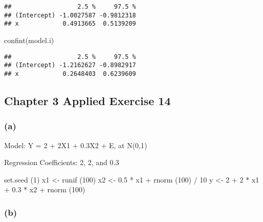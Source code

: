 \documentclass[
]{article}
\newenvironment{Shaded}{\begin{snugshade}}{\end{snugshade}}
\newcommand{\DecValTok}[1]{\textcolor[rgb]{0.00,0.00,0.81}{#1}}
\newcommand{\FloatTok}[1]{\textcolor[rgb]{0.00,0.00,0.81}{#1}}
\newcommand{\FunctionTok}[1]{\textcolor[rgb]{0.00,0.00,0.00}{#1}}
\newcommand{\NormalTok}[1]{#1}
\newcommand{\OtherTok}[1]{\textcolor[rgb]{0.56,0.35,0.01}{#1}}
\newcommand{\SpecialCharTok}[1]{\textcolor[rgb]{0.00,0.00,0.00}{#1}}
\begin{document}
\begin{verbatim}
##                  2.5 %     97.5 %
## (Intercept) -1.0027587 -0.9812318
## x            0.4913665  0.5139209
\end{verbatim}

\begin{Shaded}
\begin{Highlighting}[]
\FunctionTok{confint}\NormalTok{(model.i)}
\end{Highlighting}
\end{Shaded}

\begin{verbatim}
##                  2.5 %     97.5 %
## (Intercept) -1.2162627 -0.8982917
## x            0.2648403  0.6239609
\end{verbatim}

\hypertarget{chapter-3-applied-exercise-14}{%
\subsection{Chapter 3 Applied Exercise
14}\label{chapter-3-applied-exercise-14}}

\hypertarget{a-5}{%
\subsubsection{(a)}\label{a-5}}

Model: Y = 2 + 2X1 + 0.3X2 + E, at N(0,1)

Regression Coefficients: 2, 2, and 0.3

\begin{Shaded}
\begin{Highlighting}[]
\FunctionTok{set.seed}\NormalTok{ (}\DecValTok{1}\NormalTok{)}
\NormalTok{x1 }\OtherTok{\textless{}{-}} \FunctionTok{runif}\NormalTok{ (}\DecValTok{100}\NormalTok{)}
\NormalTok{x2 }\OtherTok{\textless{}{-}} \FloatTok{0.5} \SpecialCharTok{*}\NormalTok{ x1 }\SpecialCharTok{+} \FunctionTok{rnorm}\NormalTok{ (}\DecValTok{100}\NormalTok{) }\SpecialCharTok{/} \DecValTok{10}
\NormalTok{y }\OtherTok{\textless{}{-}} \DecValTok{2} \SpecialCharTok{+} \DecValTok{2} \SpecialCharTok{*}\NormalTok{ x1 }\SpecialCharTok{+} \FloatTok{0.3} \SpecialCharTok{*}\NormalTok{ x2 }\SpecialCharTok{+} \FunctionTok{rnorm}\NormalTok{ (}\DecValTok{100}\NormalTok{)}
\end{Highlighting}
\end{Shaded}

\hypertarget{b-4}{%
\subsubsection{(b)}\label{b-4}}
\end{document}
